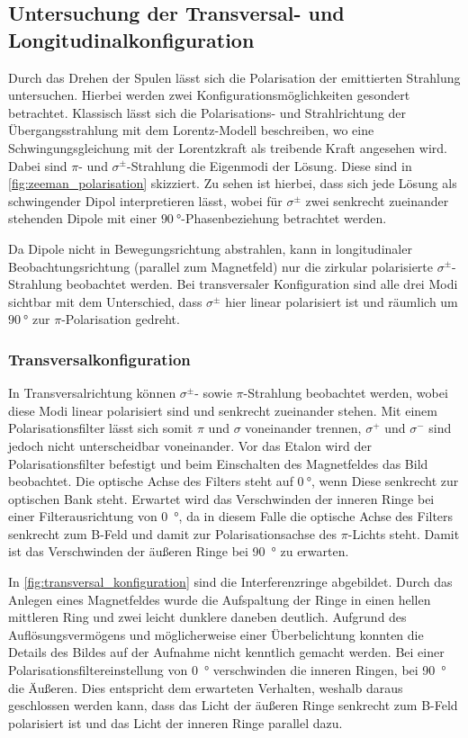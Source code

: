 \subsection{Untersuchung der Transversal- und Longitudinalkonfiguration}\label{sec:zeeman_quantitativ}
Durch das Drehen der Spulen lässt sich die Polarisation der emittierten Strahlung 
untersuchen. Hierbei werden zwei Konfigurationsmöglichkeiten gesondert betrachtet.
Klassisch lässt sich die Polarisations- und Strahlrichtung der Übergangsstrahlung 
mit dem Lorentz-Modell beschreiben, wo eine Schwingungsgleichung mit der Lorentzkraft als 
treibende Kraft angesehen wird. Dabei sind $\pi$- und $\sigma^\pm$-Strahlung die Eigenmodi 
der Lösung. Diese sind in \cref{fig:zeeman_polarisation} skizziert. Zu sehen ist hierbei, 
dass sich jede Lösung als schwingender Dipol interpretieren lässt, wobei für $\sigma^\pm$ 
zwei senkrecht zueinander stehenden Dipole mit einer $\SI{90}{\degree}$-Phasenbeziehung 
betrachtet werden.

Da Dipole nicht in Bewegungsrichtung abstrahlen, kann in longitudinaler 
Beobachtungsrichtung (parallel zum Magnetfeld) nur die zirkular polarisierte $\sigma^\pm$-Strahlung
beobachtet werden. Bei transversaler Konfiguration sind alle drei Modi sichtbar mit dem 
Unterschied, dass $\sigma^\pm$ hier linear polarisiert ist und räumlich um $\SI{90}{\degree}$
zur $\pi$-Polarisation gedreht.

\subsubsection{Transversalkonfiguration}
In Transversalrichtung können $\sigma^\pm$- sowie $\pi$-Strahlung beobachtet werden, wobei 
diese Modi linear polarisiert sind und senkrecht zueinander stehen. Mit einem Polarisationsfilter 
lässt sich somit $\pi$ und $\sigma$ voneinander trennen, $\sigma^+$ und $\sigma^-$ sind jedoch nicht 
unterscheidbar voneinander. Vor das Etalon wird der Polarisationsfilter befestigt und 
beim Einschalten des Magnetfeldes das Bild beobachtet. Die optische Achse 
des Filters steht auf $\SI{0}{\degree}$, wenn Diese senkrecht zur optischen Bank
steht. Erwartet wird das Verschwinden der inneren Ringe bei einer Filterausrichtung von 
\SI{0}{\degree}, da in diesem Falle die optische Achse des Filters senkrecht zum B-Feld und damit 
zur Polarisationsachse des $\pi$-Lichts steht. Damit ist das Verschwinden der äußeren Ringe 
bei \SI{90}{\degree} zu erwarten.

In \cref{fig:transversal_konfiguration} sind die Interferenzringe abgebildet. Durch das Anlegen
eines Magnetfeldes wurde die Aufspaltung der Ringe in einen hellen mittleren 
Ring und zwei leicht dunklere daneben deutlich. Aufgrund des Auflösungsvermögens und möglicherweise 
einer Überbelichtung konnten die Details des Bildes auf der Aufnahme nicht kenntlich
gemacht werden. Bei einer Polarisationsfiltereinstellung von \SI{0}{\degree} verschwinden
die inneren Ringen, bei \SI{90}{\degree} die Äußeren. Dies entspricht dem erwarteten Verhalten, 
weshalb daraus geschlossen werden kann, dass das Licht der äußeren Ringe senkrecht zum 
B-Feld polarisiert ist und das Licht der inneren Ringe parallel dazu.

